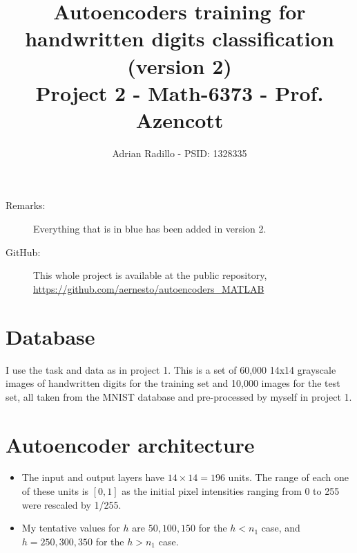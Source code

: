 \documentclass{article}
\title{Autoencoders training for handwritten digits classification {\color{blue}(version 2)} \\ {\large Project 2 - Math-6373 - Prof. Azencott}}
\author{Adrian Radillo - PSID: 1328335}
\begin{document}

\maketitle
{\color{blue}
\begin{description}
\item[Remarks:] Everything that is in blue has been added in version 2.\\
\item[GitHub:] This whole project is available at the public repository,\\ \url{https://github.com/aernesto/autoencoders_MATLAB}
\end{description}
}

\section{Database}
I use the task and data as in project 1. This is a set of
60,000 14x14 grayscale images of handwritten digits for the training set and
10,000 images for the test set, all taken from the MNIST database and pre-processed by myself
in project 1.
\section{Autoencoder architecture}
\begin{itemize}
\item The input and output layers have $14\times14=196$ units. The range of each one of these units  
is $[0,1]$ as the initial pixel intensities ranging from 0 to 255 were rescaled by 1/255.
\item My tentative values for $h$ are $50,100,150$ for the $h<n_1$ case, and $h=250,300,350$ for the $h>n_1$ case.
\end{itemize}
\end{document}
